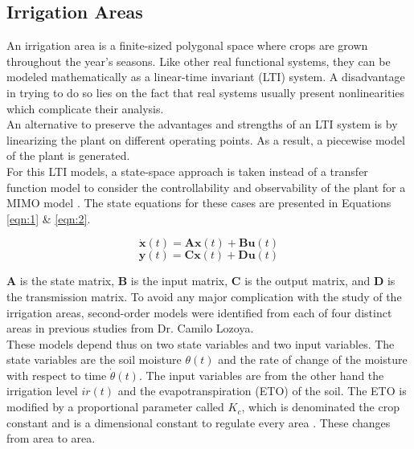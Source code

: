 \documentclass[12pt]{article}
\begin{document}
\subsection{Irrigation Areas}

An irrigation area is a finite-sized polygonal space where crops are grown throughout the year’s seasons. Like other real functional systems, they can be modeled mathematically as a linear-time invariant (LTI) system. A disadvantage in trying to do so lies on the fact that real systems usually present nonlinearities which complicate their analysis. \\

An alternative to preserve the advantages and strengths of an LTI system is by linearizing the plant on different operating points. As a result, a piecewise model of the plant is generated. \\

For this LTI models, a state-space approach is taken instead of a transfer function model to consider the controllability and observability of the plant for a MIMO model \cite{ogata}. The state equations for these cases are presented in Equations \ref{eqn:1} \& \ref{eqn:2}.

\begin{equation}
\label{eqn:1}
\mathbf{\dot{x}}(t) = \mathbf{A x}(t) + \mathbf{B u}(t)
\end{equation}
\begin{equation}
\label{eqn:2}
\mathbf{y}(t) = \mathbf{C x}(t) + \mathbf{D u}(t)
\end{equation}

$\mathbf{A}$ is the state matrix, $\mathbf{B}$ is the input matrix, $\mathbf{C}$ is the output matrix, and $\mathbf{D}$ is the transmission matrix. To avoid any major complication with the study of the irrigation areas, second-order models were identified from each of four distinct areas in previous studies from Dr. Camilo Lozoya. \\

These models depend thus on two state variables and two input variables. The state variables are the soil moisture $\theta(t)$ and the rate of change of the moisture with respect to time $\dot{\theta}(t)$. The input variables are from the other hand the irrigation level $ir(t)$ and the evapotranspiration (ETO) of the soil. The ETO is modified by a proportional parameter called $K_c$, which is denominated the crop constant and is a dimensional constant to regulate every area \cite{camilo2}. These changes from area to area. \\
\end{document}
